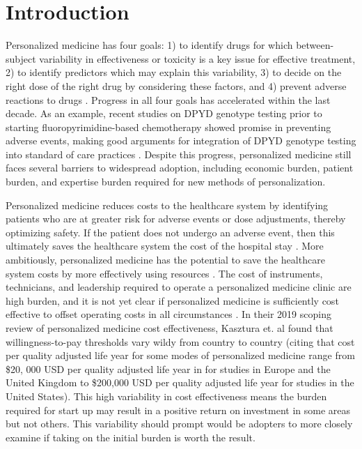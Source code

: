 \section{Introduction}

Personalized medicine has four goals: 1) to identify drugs for which between-subject variability in effectiveness or toxicity is a key issue for effective treatment, 2) to identify predictors which may explain this variability, 3) to decide on the right dose of the right drug by considering these factors, and 4) prevent adverse reactions to drugs \cite{morse2015personalized}.  Progress in all four goals has accelerated within the last decade. As an example, recent studies on DPYD genotype testing prior to starting fluoropyrimidine-based chemotherapy showed promise in preventing adverse events, making good arguments for integration of DPYD genotype testing into standard of care practices \cite{wigle2019prospective}. Despite this progress, personalized medicine still faces several barriers to widespread adoption, including economic burden, patient burden, and expertise burden required for new methods of personalization.


Personalized medicine reduces costs to the healthcare system by identifying patients who are at greater risk for adverse events or dose adjustments, thereby optimizing safety.  If the patient does not undergo an adverse event, then this ultimately saves the healthcare system the cost of the hospital stay \cite{looff2016economic}.  More ambitiously, personalized medicine has the potential to save the healthcare system costs by more effectively using resources \cite{shabaruddin2015economic}. The cost of instruments, technicians, and leadership required to operate a personalized medicine clinic are high burden, and it is not yet clear if personalized medicine is sufficiently cost effective to offset operating costs in all circumstances \cite{kasztura2019cost}.  In their 2019 scoping review of personalized medicine cost effectiveness, Kasztura et. al \cite{kasztura2019cost} found that willingness-to-pay thresholds vary wildy from country to country (citing that cost per quality adjusted life year for some modes of personalized medicine range from \$20, 000 USD per quality adjusted life year in for studies in Europe and the United Kingdom to \$200,000 USD per quality adjusted life year for studies in the United States).  This high variability in cost effectiveness means the burden required for start up may result in a positive return on investment in some areas but not others. This variability should prompt would be adopters to more closely examine if taking on the initial burden is worth the result.


